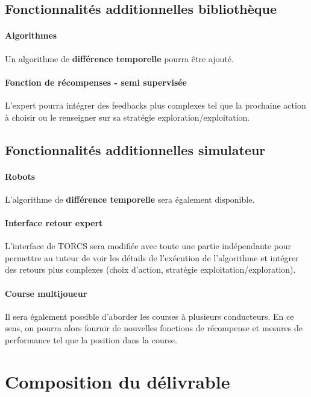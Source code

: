 \documentclass[a4paper,12pt]{article}
\begin{document}
	\subsection{Fonctionnalités additionnelles bibliothèque}
	  \paragraph{Algorithmes} Un algorithme de \textbf{différence temporelle} pourra être ajouté.
	  
	  \paragraph{Fonction de récompenses - semi supervisée} L'expert pourra intégrer des feedbacks plus complexes
	  tel que la prochaine action à choisir ou le renseigner sur sa stratégie exploration/exploitation.
	  
	\subsection{Fonctionnalités additionnelles simulateur}
	  \paragraph{Robots} L'algorithme de \textbf{différence temporelle} sera également disponible.
	  \paragraph{Interface retour expert} L'interface de TORCS sera modifiée avec toute une partie indépendante
	  pour permettre au tuteur de voir les détails de l'exécution de l'algorithme et intégrer des retours plus 
	  complexes (choix d'action, stratégie exploitation/exploration).
	  \paragraph{Course multijoueur} Il sera également possible d'aborder les courses à plusieurs conducteurs. En 
	  ce sens, on pourra alors fournir de nouvelles fonctions de récompense et mesures de performance
	  tel que la position dans la course.
	  
  
  \newpage
  \section{Composition du délivrable}
  
\end{document}
